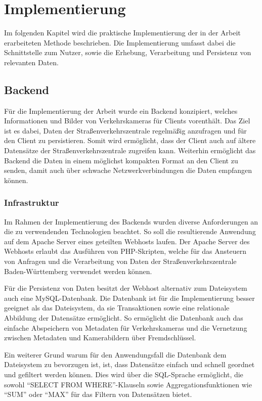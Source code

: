 \chapter{Implementierung}
Im folgenden Kapitel wird die praktische Implementierung der in der Arbeit erarbeiteten Methode beschrieben. Die Implementierung umfasst dabei die Schnittstelle zum Nutzer, sowie die Erhebung, Verarbeitung und Persistenz von relevanten Daten.
\section{Backend}
Für die Implementierung der Arbeit wurde ein Backend konzipiert, welches Informationen und Bilder von Verkehrskameras für Clients vorenthält. 
Das Ziel ist es dabei, Daten der Straßenverkehrszentrale regelmäßig anzufragen und für den Client zu persistieren. 
Somit wird ermöglicht, dass der Client auch auf ältere Datensätze der Straßenverkehrszentrale zugreifen kann. 
Weiterhin ermöglicht das Backend die Daten in einem möglichst kompakten Format an den Client zu senden, damit auch über schwache Netzwerkverbindungen die Daten empfangen können. 
\subsection{Infrastruktur}
\label{sec:infrastructure}
Im Rahmen der Implementierung des Backends wurden diverse Anforderungen an die zu verwendenden Technologien beachtet. 
So soll die resultierende Anwendung auf dem Apache Server eines geteilten Webhosts laufen. 
Der Apache Server des Webhosts erlaubt das Ausführen von PHP-Skripten, welche für das Ansteuern von Anfragen und die Verarbeitung von Daten der Straßenverkehrszentrale Baden-Württemberg verwendet werden können. 

Für die Persistenz von Daten besitzt der Webhost alternativ zum Dateisystem auch eine MySQL-Datenbank.
Die Datenbank ist für die Implementierung besser geeignet als das Dateisystem, da sie Transaktionen sowie eine relationale Abbildung der  Datensätze ermöglicht.
So ermöglicht die Datenbank auch das einfache Abspeichern von Metadaten für Verkehrskameras und die Vernetzung zwischen Metadaten und Kamerabildern über Fremdschlüssel.

Ein weiterer Grund warum für den Anwendungsfall die Datenbank dem Dateisystem zu bevorzugen ist, ist, dass Datensätze einfach und schnell geordnet und gefiltert werden können.
Dies wird über die SQL-Sprache ermöglicht, die sowohl "`SELECT FROM WHERE"'-Klauseln sowie Aggregationsfunktionen wie "`SUM"' oder "`MAX"' für das Filtern von Datensätzen bietet.

